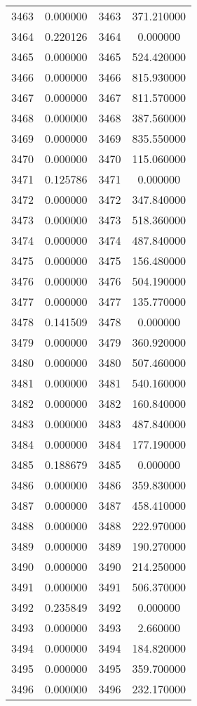 \documentclass[12pt]{article}
\begin{document}
\begin{longtable}{@{}cccc@{}}
3463 & 0.000000 & 3463 & 371.210000 \\
3464 & 0.220126 & 3464 & 0.000000 \\
3465 & 0.000000 & 3465 & 524.420000 \\
3466 & 0.000000 & 3466 & 815.930000 \\
3467 & 0.000000 & 3467 & 811.570000 \\
3468 & 0.000000 & 3468 & 387.560000 \\
3469 & 0.000000 & 3469 & 835.550000 \\
3470 & 0.000000 & 3470 & 115.060000 \\
3471 & 0.125786 & 3471 & 0.000000 \\
3472 & 0.000000 & 3472 & 347.840000 \\
3473 & 0.000000 & 3473 & 518.360000 \\
3474 & 0.000000 & 3474 & 487.840000 \\
3475 & 0.000000 & 3475 & 156.480000 \\
3476 & 0.000000 & 3476 & 504.190000 \\
3477 & 0.000000 & 3477 & 135.770000 \\
3478 & 0.141509 & 3478 & 0.000000 \\
3479 & 0.000000 & 3479 & 360.920000 \\
3480 & 0.000000 & 3480 & 507.460000 \\
3481 & 0.000000 & 3481 & 540.160000 \\
3482 & 0.000000 & 3482 & 160.840000 \\
3483 & 0.000000 & 3483 & 487.840000 \\
3484 & 0.000000 & 3484 & 177.190000 \\
3485 & 0.188679 & 3485 & 0.000000 \\
3486 & 0.000000 & 3486 & 359.830000 \\
3487 & 0.000000 & 3487 & 458.410000 \\
3488 & 0.000000 & 3488 & 222.970000 \\
3489 & 0.000000 & 3489 & 190.270000 \\
3490 & 0.000000 & 3490 & 214.250000 \\
3491 & 0.000000 & 3491 & 506.370000 \\
3492 & 0.235849 & 3492 & 0.000000 \\
3493 & 0.000000 & 3493 & 2.660000 \\
3494 & 0.000000 & 3494 & 184.820000 \\
3495 & 0.000000 & 3495 & 359.700000 \\
3496 & 0.000000 & 3496 & 232.170000 \\

\end{longtable}
\end{document}
